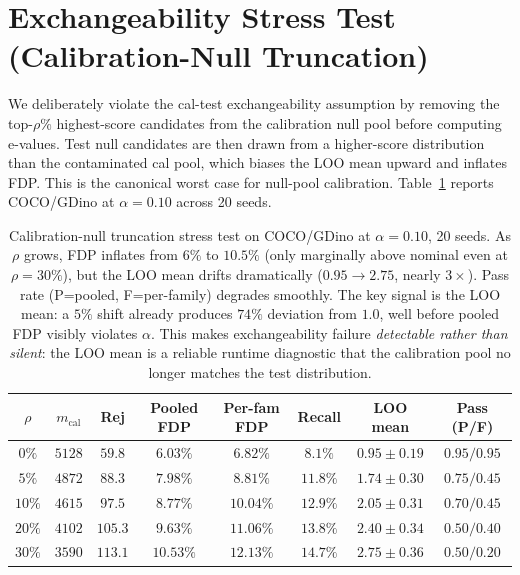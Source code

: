 \documentclass{article}
\theoremstyle{remark}
\newcommand{\1}{\mathbf{1}}
\begin{document}
\section{Exchangeability Stress Test (Calibration-Null Truncation)}
\label{app:shift_stress}

We deliberately violate the cal-test exchangeability assumption by
removing the top-$\rho\%$ highest-score candidates from the calibration
null pool before computing e-values. Test null candidates are then
drawn from a higher-score distribution than the contaminated cal pool,
which biases the LOO mean upward and inflates FDP. This is the
canonical worst case for null-pool calibration. Table~\ref{tab:shift}
reports COCO/GDino at $\alpha\!=\!0.10$ across 20 seeds.

\begin{table}[h]
\centering
\small
\begin{tabular*}{\linewidth}{@{\extracolsep{\fill}}cccccccc@{}}
\toprule
$\rho$ & $m_{\mathrm{cal}}$ & Rej & Pooled FDP & Per-fam FDP & Recall & LOO mean & Pass (P/F) \\
\midrule
$0\%$  & $5128$ & $59.8$  & $6.03\%$  & $6.82\%$  & $8.1\%$  & $0.95 \pm 0.19$ & $0.95/0.95$ \\
$5\%$  & $4872$ & $88.3$  & $7.98\%$  & $8.81\%$  & $11.8\%$ & $1.74 \pm 0.30$ & $0.75/0.45$ \\
$10\%$ & $4615$ & $97.5$  & $8.77\%$  & $10.04\%$ & $12.9\%$ & $2.05 \pm 0.31$ & $0.70/0.45$ \\
$20\%$ & $4102$ & $105.3$ & $9.63\%$  & $11.06\%$ & $13.8\%$ & $2.40 \pm 0.34$ & $0.50/0.40$ \\
$30\%$ & $3590$ & $113.1$ & $10.53\%$ & $12.13\%$ & $14.7\%$ & $2.75 \pm 0.36$ & $0.50/0.20$ \\
\bottomrule
\end{tabular*}
\caption{Calibration-null truncation stress test on COCO/GDino at
$\alpha\!=\!0.10$, 20 seeds. As $\rho$ grows, FDP inflates from
$6\%$ to $10.5\%$ (only marginally above nominal even at $\rho\!=\!30\%$),
but the LOO mean drifts dramatically ($0.95\!\to\!2.75$, nearly $3\times$).
Pass rate (P=pooled, F=per-family) degrades smoothly. The key signal
is the LOO mean: a $5\%$ shift already produces $74\%$ deviation from
$1.0$, well before pooled FDP visibly violates $\alpha$. This makes
exchangeability failure \emph{detectable rather than silent}: the
LOO mean is a reliable runtime diagnostic that the calibration pool
no longer matches the test distribution.}
\label{tab:shift}
\end{table}
\end{document}
